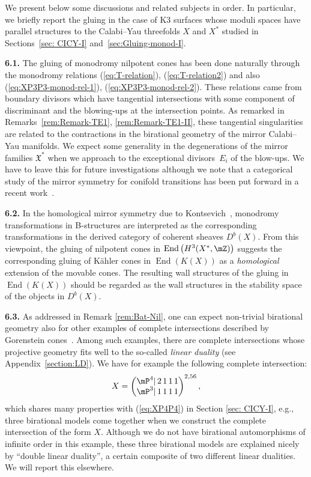 \documentclass[10pt,a4paper]{amsart}
\numberwithin{equation}{section}
\begin{document}
We present below some discussions and related subjects in order. In particular, we briefly report the gluing in the case of K3 surfaces whose moduli spaces have parallel structures to the Calabi--Yau threefolds $X$ and $X^{*}$ studied in Sections~\ref{sec: CICY-I} and~\ref{sec:Gluing-monod-I}.

{\bf 6.1.} The gluing of monodromy nilpotent cones has been done naturally through the monodromy relations (\ref{eq:T-relation}), (\ref{eq:T-relation2}) and also (\ref{eq:XP3P3-monod-rel-1}), (\ref{eq:XP3P3-monod-rel-2}). These relations came from boundary divisors which have tangential intersections with some component of discriminant and the blowing-ups at the intersection points. As remarked in Remarks~\ref{rem:Remark-TE1}, \ref{rem:Remark-TE1-II}, these tangential singularities are related to the contractions in the birational geometry of the mirror Calabi--Yau manifolds. We expect some generality in the degenerations of the mirror families $\mathfrak{X}^{*}$ when we approach to the exceptional divisors~$E_{i}$ of the blow-ups. We have to leave this for future investigations although we note that a categorical study of the mirror symmetry for conifold transitions has been put forward in a recent work~\cite{FHLY}.

{\bf 6.2.} In the homological mirror symmetry due to Kontsevich~\cite{Ko}, monodromy transformations in B-structures are interpreted as the corresponding transformations in the derived category of coherent sheaves $D^{b}(X)$. From this viewpoint, the gluing of nilpotent cones in $\operatorname{End}\big(H^{3}(X^{*},\mZ)\big)$ suggests the corresponding gluing of K\"ahler cones in $\operatorname{End}(K(X))$ as a \textit{homological} extension of the movable cones. The resulting wall structures of the gluing in $\operatorname{End}(K(X))$ should be regarded as the wall structures in the stability space \cite{Brid} of the objects in $D^{b}(X)$.

{\bf 6.3.} As addressed in Remark \ref{rem:Bat-Nil}, one can expect non-trivial birational geometry also for other examples of complete intersections described by Gorenstein cones~\cite{BatNil}. Among such examples, there are complete intersections whose projective geometry fits well to the so-called \textit{linear duality} (see Appendix~\ref{section:LD}). We have for example the following complete intersection:
\begin{gather*}
X=\left(\begin{matrix}\mP^{4}|\,2\,1\,1\,1\\
\mP^{3}|\,1\,1\,1\,1
\end{matrix}\right)^{2,56},
\end{gather*}
which shares many properties with (\ref{eq:XP4P4}) in Section \ref{sec: CICY-I}, e.g., three birational models come together when we construct the complete intersection of the form $X$. Although we do not have birational
automorphisms of infinite order in this example, these three birational models are explained nicely by ``double linear duality'', a certain composite of two different linear dualities. We will report this elsewhere.
\end{document}
